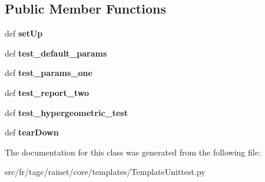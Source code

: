 \subsection*{Public Member Functions}
\begin{DoxyCompactItemize}
\item 
\hypertarget{classsrc_1_1fr_1_1tagc_1_1rainet_1_1core_1_1templates_1_1TemplateUnittest_1_1TemplateUnittest_a9285a2887ba2319cd1e01f3fc6c2fbb1}{def {\bfseries set\-Up}}\label{classsrc_1_1fr_1_1tagc_1_1rainet_1_1core_1_1templates_1_1TemplateUnittest_1_1TemplateUnittest_a9285a2887ba2319cd1e01f3fc6c2fbb1}

\item 
\hypertarget{classsrc_1_1fr_1_1tagc_1_1rainet_1_1core_1_1templates_1_1TemplateUnittest_1_1TemplateUnittest_aa650a6deddbfb5eac252cbee0f0363ff}{def {\bfseries test\-\_\-default\-\_\-params}}\label{classsrc_1_1fr_1_1tagc_1_1rainet_1_1core_1_1templates_1_1TemplateUnittest_1_1TemplateUnittest_aa650a6deddbfb5eac252cbee0f0363ff}

\item 
\hypertarget{classsrc_1_1fr_1_1tagc_1_1rainet_1_1core_1_1templates_1_1TemplateUnittest_1_1TemplateUnittest_a564e0e47e48f549a8086f84a8ac7e553}{def {\bfseries test\-\_\-params\-\_\-one}}\label{classsrc_1_1fr_1_1tagc_1_1rainet_1_1core_1_1templates_1_1TemplateUnittest_1_1TemplateUnittest_a564e0e47e48f549a8086f84a8ac7e553}

\item 
\hypertarget{classsrc_1_1fr_1_1tagc_1_1rainet_1_1core_1_1templates_1_1TemplateUnittest_1_1TemplateUnittest_a2bb8be8ecfe062cfc097612b9c88edd3}{def {\bfseries test\-\_\-report\-\_\-two}}\label{classsrc_1_1fr_1_1tagc_1_1rainet_1_1core_1_1templates_1_1TemplateUnittest_1_1TemplateUnittest_a2bb8be8ecfe062cfc097612b9c88edd3}

\item 
\hypertarget{classsrc_1_1fr_1_1tagc_1_1rainet_1_1core_1_1templates_1_1TemplateUnittest_1_1TemplateUnittest_a9b26785125e759845c9cbf2ee98430e5}{def {\bfseries test\-\_\-hypergeometric\-\_\-test}}\label{classsrc_1_1fr_1_1tagc_1_1rainet_1_1core_1_1templates_1_1TemplateUnittest_1_1TemplateUnittest_a9b26785125e759845c9cbf2ee98430e5}

\item 
\hypertarget{classsrc_1_1fr_1_1tagc_1_1rainet_1_1core_1_1templates_1_1TemplateUnittest_1_1TemplateUnittest_a8cd7ce3ec8f8cc3870cee1ef6e287bd1}{def {\bfseries tear\-Down}}\label{classsrc_1_1fr_1_1tagc_1_1rainet_1_1core_1_1templates_1_1TemplateUnittest_1_1TemplateUnittest_a8cd7ce3ec8f8cc3870cee1ef6e287bd1}

\end{DoxyCompactItemize}


The documentation for this class was generated from the following file\-:\begin{DoxyCompactItemize}
\item 
src/fr/tagc/rainet/core/templates/Template\-Unittest.\-py\end{DoxyCompactItemize}
